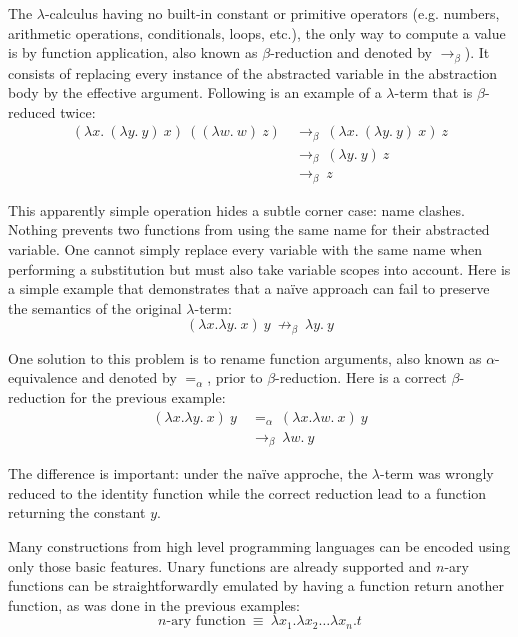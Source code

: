 The $\lambda$-calculus having no built-in constant or primitive operators (e.g. numbers, arithmetic
operations, conditionals, loops, etc.), the only way to compute a value is by function application,
also known as $\beta$-reduction and denoted by $\to_\beta$). It consists of replacing every instance
of the abstracted variable in the abstraction body by the effective argument. Following is an
example of a $\lambda$-term that is $\beta$-reduced twice:
\begin{align*}
  (\lambda x. \ (\lambda y. \ y) \ x) \ ((\lambda w. \ w) \ z)
    & \: \to_\beta \: (\lambda x. \ (\lambda y. \ y) \ x) \ z \\
    & \: \to_\beta \: (\lambda y. \ y) \ z \\
    & \: \to_\beta \: z
\end{align*}

This apparently simple operation hides a subtle corner case: name clashes. Nothing prevents two
functions from using the same name for their abstracted variable. One cannot simply replace every
variable with the same name when performing a substitution but must also take variable scopes into
account. Here is a simple example that demonstrates that a naïve approach can fail to preserve the
semantics of the original $\lambda$-term:
\begin{displaymath}
  (\lambda x. \lambda y. \ x) \ y \: \not\to_\beta \: \lambda y. \ y
\end{displaymath}

One solution to this problem is to rename function arguments, also known as $\alpha$-equivalence and
denoted by $=_\alpha$, prior to $\beta$-reduction. Here is a correct $\beta$-reduction for the
previous example:
\begin{align*}
  (\lambda x. \lambda y. \ x) \ y
    & \: =_\alpha \: (\lambda x. \lambda w. \ x) \ y \\
    & \: \to_\beta \: \lambda w. \ y
\end{align*}

The difference is important: under the naïve approche, the $\lambda$-term was wrongly reduced to the
identity function while the correct reduction lead to a function returning the constant $y$.

Many constructions from high level programming languages can be encoded using only those basic
features. Unary functions are already supported and $n$-ary functions can be straightforwardly
emulated by having a function return another function, as was done in the previous examples:
\begin{displaymath}
  n\text{-ary function} \: \equiv \: \lambda x_1. \lambda x_2 \dots \lambda x_n. t
\end{displaymath}

